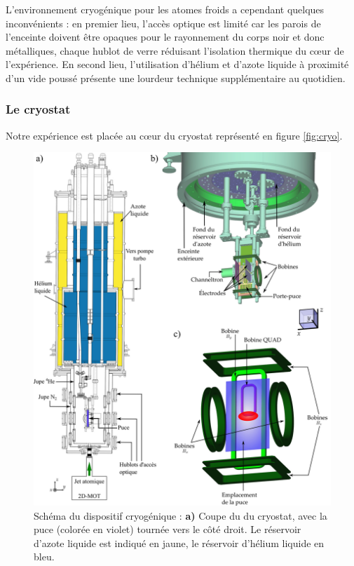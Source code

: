 L'environnement cryogénique pour les atomes froids a cependant quelques inconvénients :
en premier lieu, l'accès optique est limité car les parois de l'enceinte doivent être opaques pour le rayonnement du corps noir et donc métalliques, chaque hublot de verre réduisant l'isolation thermique du c\oe ur de l'expérience.
En second lieu, l'utilisation d'hélium et d'azote liquide à proximité d'un vide poussé présente une lourdeur technique supplémentaire au quotidien.

\subsubsection*{Le cryostat}
\noindent Notre expérience est placée au c\oe ur du cryostat représenté en figure \eqref{fig:cryo}.
%
\begin{figure}
\centering
\includegraphics[width=\linewidth]{figures/setup/coldatoms/cryo_vect2.jpg}
\caption[Schéma du cryostat]{Schéma du dispositif cryogénique :
\textbf{a)} Coupe du du cryostat, avec la puce (colorée en violet) tournée vers le côté droit.
Le réservoir d'azote liquide est indiqué en jaune, le réservoir d'hélium liquide en bleu.
}
\end{figure}
